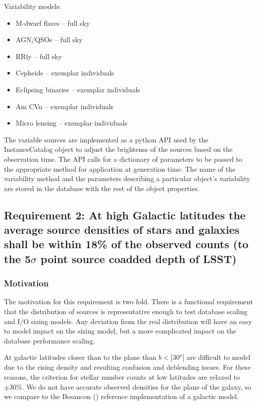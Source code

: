 \documentclass[]{article}
\begin{document}
Variability models:
\begin{itemize}
\item M-dwarf flares -- full sky
\item AGN/QSOs -- full sky
\item RRly -- full sky
\item Cepheids -- exemplar individuals
\item Eclipsing binaries -- exemplar individuals
\item Am CVn -- exemplar individuals
\item Micro lensing -- exemplar individuals
\end{itemize}

The variable sources are implemented as a python API used by the InstanceCatalog object to adjust the brightenss of the sources based on the observation time.
The API calls for a dictionary of parameters to be passed to the appropriate method for application at generation time.  The name of the variability method and
the parameters describing a particular object's variability are stored in the database with the rest of the object properties.

\subsection{Requirement 2: At high Galactic latitudes the average source densities of stars and galaxies
shall be within 18\% of the observed counts (to the 5$\sigma$ point source coadded depth of LSST)}
\subsubsection{Motivation}
The motivation for this requirement is two fold.  There is a functional requirement that the distribution of sources is representative
enough to test database scaling and I/O sizing models.  Any deviation from the real distribution will have an easy to model impact 
on the sizing model, but a more complicated impact on the database performance scaling. 

At galactic latitudes closer than to the plane than $b < |30^o|$ are difficult to model due to the rising density and resulting confusion and deblending issues.
For these reasons, the criterion for stellar number counts at low latitudes are relaxed to $\pm 30\%$.  We do not have accurate observed densities for the plane 
of the galaxy, so we compare to the Besancon (\cite{besancon}) reference implementation of a galactic model.
\end{document}
